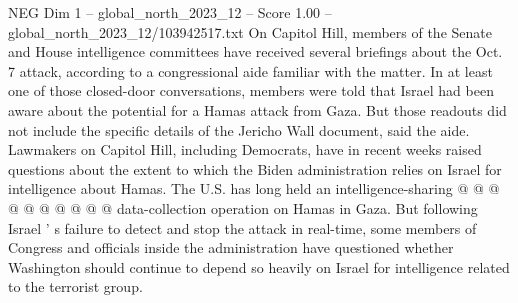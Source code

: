 \begin{textsample}{NEG Dim 1 – global\_north\_2023\_12 – Score 1.00 – global\_north\_2023\_12/103942517.txt}
On Capitol Hill, members of the Senate and House intelligence committees have received several briefings about the Oct. 7 attack, according to a congressional aide familiar with the matter.
In at least one of those closed-door conversations, members were told that Israel had been aware about the potential for a Hamas attack from Gaza.
But those readouts did not include the specific details of the Jericho Wall document, said the aide.
Lawmakers on Capitol Hill, including Democrats, have in recent weeks raised questions about the extent to which the Biden administration relies on Israel for intelligence about Hamas.
The U.S. has long held an intelligence-sharing @ @ @ @ @ @ @ @ @ @ data-collection operation on Hamas in Gaza.
But following Israel ' s failure to detect and stop the attack in real-time, some members of Congress and officials inside the administration have questioned whether Washington should continue to depend so heavily on Israel for intelligence related to the terrorist group.

\end{textsample}
